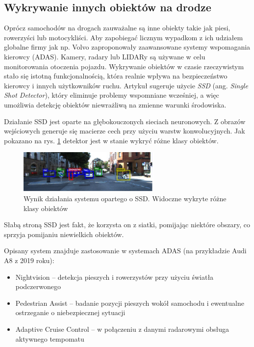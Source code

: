 
\subsection{Wykrywanie innych obiektów na drodze}

Oprócz samochodów na drogach zauważalne są inne obiekty takie jak piesi, rowerzyści lub motocykliści. 
Aby zapobiegać licznym wypadkom z ich udziałem globalne firmy jak np. Volvo zaproponowały zaawansowane systemy wspomagania kierowcy (ADAS).
Kamery, radary lub LIDARy są używane w celu monitorowania otoczenia pojazdu. 
Wykrywanie obiektów w czasie rzeczywistym stało się istotną funkcjonalnością, która realnie wpływa na bezpieczeństwo kierowcy i innych użytkowników ruchu.
Artykuł \cite{T12} sugeruje użycie \textit{SSD} (ang. \textit{Single Shot Detector}), który eliminuje problemy wspomniane wcześniej, a więc umożliwia detekcję obiektów niewrażliwą na zmienne warunki środowiska.

Działanie SSD jest oparte na głębokouczonych sieciach neuronowych. 
Z obrazów wejściowych generuje się macierze cech przy użyciu warstw konwolucyjnych. 
Jak pokazano na rys. \ref{fig:pedestrian_detect_result} detektor jest w stanie wykryć różne klasy obiektów.

\begin{figure}
  \centering
  \includegraphics[width=7cm]{img/pedestrian_detect_result.png}
  \caption{Wynik działania systemu opartego o SSD. Widoczne wykryte różne klasy obiektów \cite{T11}}
  \label{fig:pedestrian_detect_result}
\end{figure}

Słabą stroną SSD jest fakt, że korzysta on z siatki, pomijając niektóre obszary, co sprzyja pomijaniu niewielkich obiektów.

Opisany system znajduje zastosowanie w systemach ADAS (na przykładzie Audi A8 z 2019 roku):
\begin{itemize}
\item Nightvision -- detekcja pieszych i rowerzystów przy użyciu światła podczerwonego
\item Pedestrian Assist -- badanie pozycji pieszych wokół samochodu i ewentualne ostrzeganie o niebezpiecznej sytuacji
\item Adaptive Cruise Control -- w połączeniu z danymi radarowymi obsługa aktywnego tempomatu
\end{itemize}


